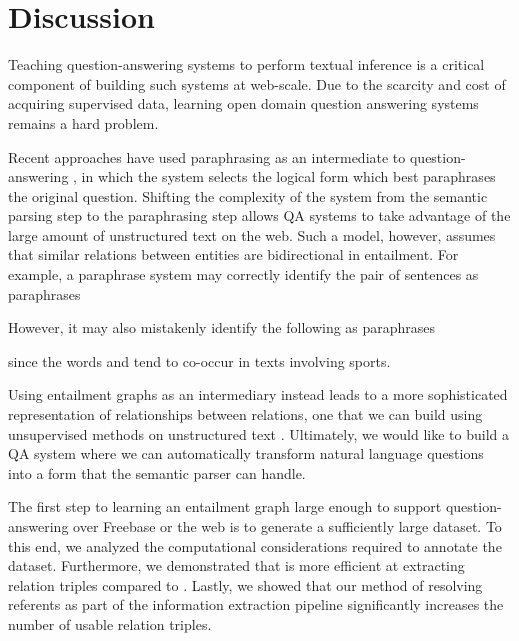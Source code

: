 \section{Discussion}

Teaching question-answering systems to perform textual inference
is a critical component of building such systems at web-scale. 
Due to the scarcity and cost of acquiring supervised data, learning
open domain question answering systems remains a hard problem. 

Recent approaches have used paraphrasing as an intermediate to question-answering
\citep{berant2014paraphrasing}, in which the system selects the 
logical form which best paraphrases the original question. Shifting the complexity of the system from the semantic parsing step to the
paraphrasing step allows QA systems to take advantage of the large
amount of unstructured text on the web.
Such a model,
however, assumes that similar relations between entities are bidirectional 
in entailment. For example, a paraphrase system may correctly identify
the pair of sentences as paraphrases
\begin{description}
  \item {}
  \item {}
\end{description}

However, it may also mistakenly identify the following as paraphrases
\begin{description}
  \item {}
  \item {}
\end{description}
since the words  and  tend to co-occur in 
texts involving sports. 

Using entailment graphs as an intermediary instead leads to a more
sophisticated representation of relationships between relations, one that 
we can build using unsupervised methods on unstructured text \citep{berant2010global,berant2011global,berant2012efficient}. Ultimately, we would like to
build a QA system where we can automatically transform natural
language questions into a form that the semantic parser can handle.

The first step to learning an entailment graph large enough to
support question-answering over Freebase or the web is to generate
a sufficiently large dataset. To this end, we analyzed the computational
considerations required to annotate the \newsspike{} dataset. Furthermore,
we demonstrated that \openie{} is more efficient at extracting relation
triples compared to \reverb{}. Lastly, we showed that our method of
resolving referents as part of the information extraction pipeline
significantly increases the number of usable relation triples.

